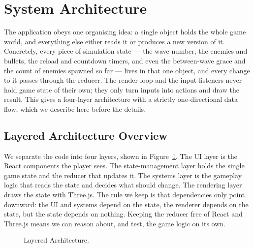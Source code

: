 \documentclass[12pt,a4paper]{report}
\begin{document}
\section{System Architecture}

The application obeys one organising idea: a single object holds the whole game
world, and everything else either reads it or produces a new version of it.
Concretely, every piece of simulation state --- the wave number, the enemies and
bullets, the reload and countdown timers, and even the between-wave grace and the
count of enemies spawned so far --- lives in that one object, and every change to
it passes through the reducer. The render loop and the input listeners never hold
game state of their own; they only turn inputs into actions and draw the result.
This gives a four-layer architecture with a strictly one-directional data flow,
which we describe here before the details.

\subsection{Layered Architecture Overview}

We separate the code into four layers, shown in Figure~\ref{fig:layers}. The UI
layer is the React components the player sees. The state-management layer holds
the single game state and the reducer that updates it. The systems layer is the
gameplay logic that reads the state and decides what should change. The
rendering layer draws the state with Three.js. The rule we keep is that
dependencies only point downward: the UI and systems depend on the state, the
renderer depends on the state, but the state depends on nothing. Keeping the
reducer free of React and Three.js means we can reason about, and test, the game
logic on its own.

\begin{figure}[htbp]
\centering
{}
\caption{Layered Architecture.}
\label{fig:layers}
\end{figure}
\end{document}
